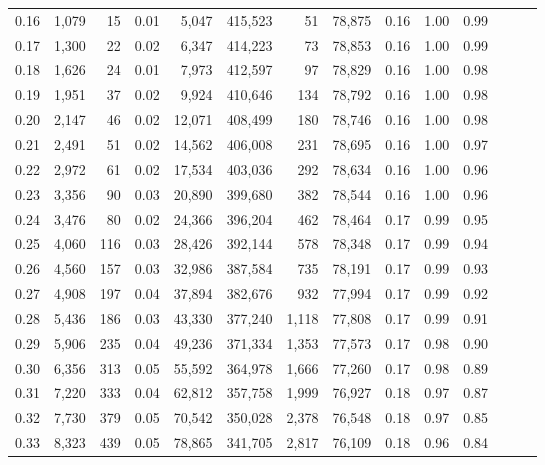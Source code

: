 \begin{tabular}{rrrrrrrrrrrrrr}
0.16 &   1,079 &     15 &  0.01 &    5,047 &  415,523 &      51 &  78,875 &  0.16 &  1.00 &      0.99 \\
0.17 &   1,300 &     22 &  0.02 &    6,347 &  414,223 &      73 &  78,853 &  0.16 &  1.00 &      0.99 \\
0.18 &   1,626 &     24 &  0.01 &    7,973 &  412,597 &      97 &  78,829 &  0.16 &  1.00 &      0.98 \\
0.19 &   1,951 &     37 &  0.02 &    9,924 &  410,646 &     134 &  78,792 &  0.16 &  1.00 &      0.98 \\
0.20 &   2,147 &     46 &  0.02 &   12,071 &  408,499 &     180 &  78,746 &  0.16 &  1.00 &      0.98 \\
0.21 &   2,491 &     51 &  0.02 &   14,562 &  406,008 &     231 &  78,695 &  0.16 &  1.00 &      0.97 \\
0.22 &   2,972 &     61 &  0.02 &   17,534 &  403,036 &     292 &  78,634 &  0.16 &  1.00 &      0.96 \\
0.23 &   3,356 &     90 &  0.03 &   20,890 &  399,680 &     382 &  78,544 &  0.16 &  1.00 &      0.96 \\
0.24 &   3,476 &     80 &  0.02 &   24,366 &  396,204 &     462 &  78,464 &  0.17 &  0.99 &      0.95 \\
0.25 &   4,060 &    116 &  0.03 &   28,426 &  392,144 &     578 &  78,348 &  0.17 &  0.99 &      0.94 \\
0.26 &   4,560 &    157 &  0.03 &   32,986 &  387,584 &     735 &  78,191 &  0.17 &  0.99 &      0.93 \\
0.27 &   4,908 &    197 &  0.04 &   37,894 &  382,676 &     932 &  77,994 &  0.17 &  0.99 &      0.92 \\
0.28 &   5,436 &    186 &  0.03 &   43,330 &  377,240 &   1,118 &  77,808 &  0.17 &  0.99 &      0.91 \\
0.29 &   5,906 &    235 &  0.04 &   49,236 &  371,334 &   1,353 &  77,573 &  0.17 &  0.98 &      0.90 \\
0.30 &   6,356 &    313 &  0.05 &   55,592 &  364,978 &   1,666 &  77,260 &  0.17 &  0.98 &      0.89 \\
0.31 &   7,220 &    333 &  0.04 &   62,812 &  357,758 &   1,999 &  76,927 &  0.18 &  0.97 &      0.87 \\
0.32 &   7,730 &    379 &  0.05 &   70,542 &  350,028 &   2,378 &  76,548 &  0.18 &  0.97 &      0.85 \\
0.33 &   8,323 &    439 &  0.05 &   78,865 &  341,705 &   2,817 &  76,109 &  0.18 &  0.96 &      0.84 \\

\end{tabular}
